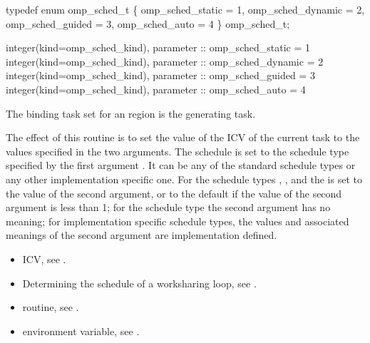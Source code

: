 \begin{ccppspecific}
\begin{boxedcode}
typedef enum omp\_sched\_t \{
    omp\_sched\_static = 1,
    omp\_sched\_dynamic = 2,
    omp\_sched\_guided = 3,
    omp\_sched\_auto = 4
\} omp\_sched\_t;
\end{boxedcode}
\end{ccppspecific}

\begin{samepage}
\begin{fortranspecific}
\begin{boxedcode}
integer(kind=omp\_sched\_kind), parameter :: omp\_sched\_static = 1
integer(kind=omp\_sched\_kind), parameter :: omp\_sched\_dynamic = 2
integer(kind=omp\_sched\_kind), parameter :: omp\_sched\_guided = 3
integer(kind=omp\_sched\_kind), parameter :: omp\_sched\_auto = 4
\end{boxedcode}
\end{fortranspecific}
\end{samepage}

\binding
The binding task set for an  region is the generating task. 

\effect
The effect of this routine is to set the value of the  ICV of the current task 
to the values specified in the two arguments. The schedule is set to the schedule type 
specified by the first argument . It can be any of the standard schedule types or 
any other implementation specific one. For the schedule types , , and 
 the  is set to the value of the second argument, or to the default 
 if the value of the second argument is less than 1; for the schedule type 
 the second argument has no meaning; for implementation specific schedule types, 
the values and associated meanings of the second argument are implementation defined.

\crossreferences
\begin{itemize}
\item {} ICV, see 
.

\item Determining the schedule of a worksharing loop, see 
.

\item {} routine, see 
.

\item {} environment variable, see 
.
\end{itemize}









